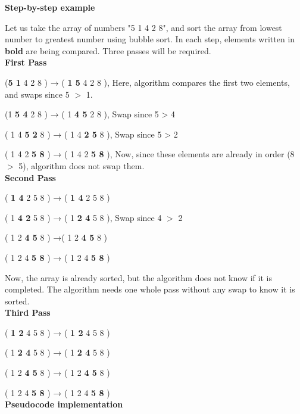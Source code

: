 \documentclass[12pt,a4paper]{book}
\begin{document}
\noindent \textbf {Step-by-step example}
\par Let us take the array of numbers "5 1 4 2 8", and sort the array from lowest number to greatest number using bubble sort. In each step, elements written in \textbf{bold} are being compared. Three passes will be required.\\

\noindent \textbf {First Pass}\par
(\textbf{5 1} 4 2 8 ) → (\textbf{ 1 5} 4 2 8 ), Here, algorithm compares the first two elements, and swaps since 5 $>$ 1.\par
(1 \textbf{5 4} 2 8 ) → ( 1 \textbf{4 5} 2 8 ), Swap since 5 > 4 \par
( 1 4 \textbf{5 2} 8 ) → ( 1 4 \textbf{2 5} 8 ), Swap since 5 > 2 \par
( 1 4 2 \textbf{5 8} ) → ( 1 4 2 \textbf{5 8} ), Now, since these elements are already in order (8 $>$ 5), algorithm does not swap them.\\

\noindent \textbf {Second Pass}\par
( \textbf{1 4} 2 5 8 ) → ( \textbf{1 4} 2 5 8 ) \par
( 1 \textbf{4 2} 5 8 ) → ( 1 \textbf{2 4} 5 8 ), Swap since 4 $>$ 2 \par
( 1 2 \textbf{4 5} 8 ) →( 1 2 \textbf{4 5} 8 ) \par
( 1 2 4 \textbf{5 8} ) → ( 1 2 4 \textbf{5 8 }) \par
Now, the array is already sorted, but the algorithm does not know if it is completed. The algorithm needs one whole pass without any swap to know it is sorted.\\

\noindent \textbf {Third Pass} \par
\par ( \textbf{1 2} 4 5 8 ) → ( \textbf{1 2} 4 5 8 ) \par
\par ( 1 \textbf{2 4} 5 8 ) → ( 1 \textbf{2 4} 5 8 ) \par
\par ( 1 2 \textbf{4 5} 8 ) → ( 1 2 \textbf{4 5} 8 ) \par 
\par ( 1 2 4 \textbf{5 8} ) → ( 1 2 4 \textbf{5 8} )\\

\noindent \textbf {Pseudocode implementation}

\end{document}
